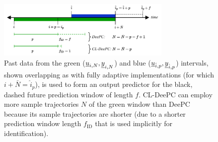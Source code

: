 \begin{figure}[b!]
	\centering
	\includegraphics[trim={0.0cm 0.1cm 0.0cm 0.0cm},clip,width=8.4cm]{docs/manuscript/figures/intervals_DeePC.pdf}%
	\caption{Past data from the green ($\underline{u}_{i,\relax{N}},\underline{y}_{i,\relax{N}}$) and blue ($\underline{u}_{\hat{i},p},\underline{y}_{\hat{i},p}$) intervals, shown overlapping as with fully adaptive implementations (for which $i+\bar{N}=\hat{i}_p$), is used to form an output predictor for the black, dashed future prediction window of length $f$. \ac{CL-DeePC} can employ more sample trajectories $N$ of the green window than \ac{DeePC} because its sample trajectories are shorter (due to a shorter prediction window length $f_\mathrm{ID}$ that is used implicitly for identification).}
	\label{fig:intervals_DeePC}
\end{figure}
%

